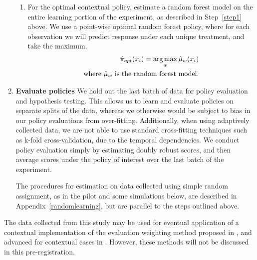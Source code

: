 \documentclass[letterpaper, 12pt, parskip=full,DIV=10]{scrartcl}
\begin{document}
\begin{enumerate}
\begin{enumerate}
    \item For the optimal contextual policy, estimate a random forest model on the entire learning portion of the experiment, as described in Step~\ref{step1} above. We use a {point-wise optimal random forest policy,} where for each observation we will predict response under each unique treatment, and take the maximum.
        \begin{align*}
            \hat{\pi}_{opt}(x_i)  =     \operatorname*{arg\,max}_{w}
            \hat{\mu}_{w}(x_i) \\
             \text{where }\hat{\mu}_{w} \text{ is the random forest model.}
        \end{align*}
\end{enumerate}
\item \textbf{Evaluate policies} We hold out the last batch of data for policy evaluation and hypothesis testing. This allows us to learn and evaluate policies on separate splits of the data, whereas we otherwise would be subject to bias in our policy evaluations from over-fitting. Additionally, when using adaptively collected data, we are not able to use standard cross-fitting techniques such as k-fold cross-validation, due to the temporal dependencies. We conduct policy evaluation simply by estimating doubly robust scores, and then average scores under the policy of interest over the last batch of the experiment. 

The procedures for estimation on data collected using simple random assignment, as in the pilot and some simulations below, are described in Appendix~\ref{randomlearning}, but are parallel to the steps outlined above. %
\end{enumerate}
The data collected from this study may be used for eventual application of a contextual implementation of the evaluation weighting method proposed in \cite{hadad2019confidence}, and advanced for contextual cases in \cite{zhan2020retrospective}. However, these methods will not be discussed in this pre-registration. 
\end{document}

